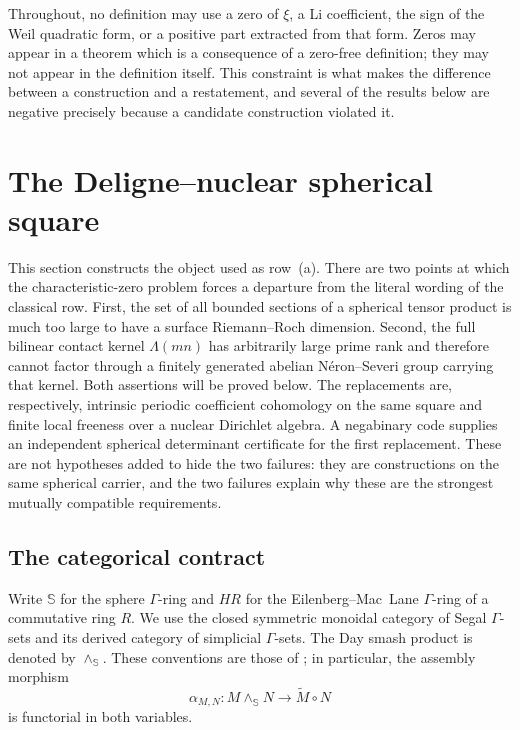 \documentclass[11pt]{amsart}
\theoremstyle{definition}
\theoremstyle{remark}
\begin{document}
Throughout, no definition may use a zero of $\xi$, a Li coefficient, the
sign of the Weil quadratic form, or a positive part extracted from that
form.  Zeros may appear in a theorem which is a consequence of a zero-free
definition; they may not appear in the definition itself.  This constraint
is what makes the difference between a construction and a restatement, and
several of the results below are negative precisely because a candidate
construction violated it.


\section{The Deligne--nuclear spherical square}
\label{sec:geometric-a}

This section constructs the object used as row~(a).  There are two points at
which the characteristic-zero problem forces a departure from the literal
wording of the classical row.  First, the set of all bounded sections of a
spherical tensor product is much too large to have a surface
Riemann--Roch dimension.  Second, the full bilinear contact kernel
$\Lambda(mn)$ has arbitrarily large prime rank and therefore cannot factor
through a finitely generated abelian N\'eron--Severi group carrying that
kernel.  Both assertions will be proved below.  The
replacements are, respectively, intrinsic periodic coefficient cohomology
on the same square and finite local freeness over a nuclear Dirichlet
algebra.  A negabinary code supplies an independent spherical determinant
certificate for the first replacement.  These are
not hypotheses added to hide the two failures: they are constructions on the
same spherical carrier, and the two failures explain why these are the
strongest mutually compatible requirements.

\subsection{The categorical contract}

Write $\mathbb S$ for the sphere $\Gamma$-ring and $HR$ for the
Eilenberg--Mac~Lane $\Gamma$-ring of a commutative ring $R$.  We use the
closed symmetric monoidal category of Segal $\Gamma$-sets and its derived
category of simplicial $\Gamma$-sets.  The Day smash product is denoted by
$\wedge_{\mathbb S}$.  These conventions are those of
\cite[\S\S2,7]{CC-AbsoluteAlgebra}; in particular, the assembly morphism
\begin{equation}\label{eq:assembly}
 \alpha_{M,N}:M\wedge_{\mathbb S}N\longrightarrow \widetilde M\circ N
\end{equation}
is functorial in both variables.
\end{document}
